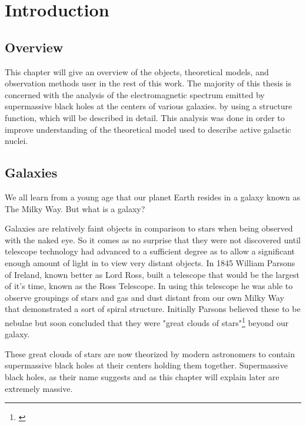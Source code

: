 \documentclass[12pt, oneside]{smuthesis}
\begin{document}
\chapter{\sc Introduction} \label{introduction}

\section{\sc Overview} \label{overview}

This chapter will give an overview of the objects, theoretical models, and observation methods user in the rest of this work. The majority of this thesis is concerned with the analysis of the electromagnetic spectrum emitted by supermassive black holes at the centers of various galaxies. by using a structure function, which will be described in detail. This analysis was done in order to improve understanding of the theoretical model used to describe active galactic nuclei.

\section{\sc Galaxies} \label{galaxies}

We all learn from a young age that our planet Earth resides in a galaxy known as The Milky Way. But what is a galaxy?

Galaxies are relatively faint objects in comparison to stars when being observed with the naked eye. So it comes as no surprise that they were not discovered until telescope technology had advanced to a sufficient degree as to allow a significant enough amount of light in to view very distant objects. In 1845 William Parsons of Ireland, known better as Lord Ross, built a telescope that would be the largest of it's time, known as the Ross Telescope. In using this telescope he was able to observe groupings of stars and gas and dust distant from our own Milky Way that demonstrated a sort of spiral structure. Initially Parsons believed these to be nebulae but soon concluded that they were "great clouds of stars"\footnote{\cite{sag}} beyond our galaxy.

These great clouds of stars are now theorized by modern astronomers to contain supermassive black holes at their centers holding them together. Supermassive black holes, as their name suggests and as this chapter will explain later are extremely massive.
\end{document}

